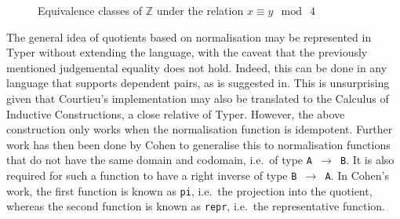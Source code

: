 \documentclass[12pt,twoside,maitrise]{dms}
\theoremstyle{definition}
\numberwithin{equation}{section}
\numberwithin{table}{chapter}
\numberwithin{figure}{chapter}
\newcommand\id[1] {\texttt{#1}}
\newcommand\fn[1] {\texttt{#1}}
\begin{document}
\begin{figure}
  \centering
{}
\caption{Equivalence classes of $\mathbb{Z}$ under the relation $x \equiv y \mod \ 4$}\label{fig:eq-class-zmod4}
\end{figure}

The general idea of quotients based on normalisation may be represented in Typer
without extending the language, with the caveat that the previously mentioned
judgemental equality does not hold. Indeed, this can be done in any language
that supports dependent pairs, as is suggested in\cite[Chap~6.10]{HoTTbook}.
This is unsurprising given that Courtieu's implementation may also be translated
to the Calculus of Inductive Constructions\cite{werner-cic}, a close relative of
Typer. However, the above construction only works when the normalisation
function is idempotent. Further work has then been done by
Cohen\cite{cohen2013pragmatic} to generalise this to normalisation functions
that do not have the same domain and codomain, i.e.\ of type \fn{A $\rightarrow$
  B}. It is also required for such a function to have a right inverse of type
\fn{B $\rightarrow$ A}. In Cohen's work, the first function is known as \id{pi},
i.e.\ the projection into the quotient, whereas the second function is known as
\id{repr}, i.e.\ the representative function.
\end{document}
